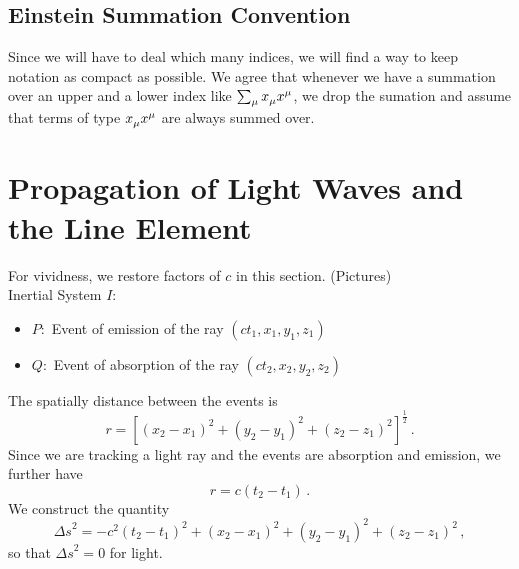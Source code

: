 \subsection{Einstein Summation Convention}
Since we will have to deal which many indices, we will find a way to keep
notation as compact as possible. We agree that whenever we have a summation over an
upper and a lower index like $\sum_\mu \tensor{x}{_\mu}\tensor{x}{^\mu}$, we
drop the sumation and assume that terms of type
$\tensor{x}{_\mu}\tensor{x}{^\mu}$ are always summed over.
\section{Propagation of Light Waves and the Line Element}
For vividness, we restore factors of $c$ in this section.
(Pictures)\\
Inertial System $I$:
\begin{itemize}
    \item $P:$ Event of emission of the ray $(ct_1,x_1,y_1,z_1)$
    \item $Q:$ Event of absorption of the ray $(ct_2,x_2,y_2,z_2)$
\end{itemize}
The spatially distance between the events is
\begin{equation}
    r=\left[(x_2-x_1)^2+(y_2-y_1)^2+(z_2-z_1)^2\right]^{\frac{1}{2}}\, .
\end{equation}
Since we are tracking a light ray and the events are absorption and emission, we
further have
\begin{equation}
    r=c(t_2-t_1)\, .
\end{equation}
We construct the quantity
\begin{equation}
    {\Delta s}^2=-c^2(t_2-t_1)^2+(x_2-x_1)^2+(y_2-y_1)^2+(z_2-z_1)^2\, ,
\end{equation}
so that ${\Delta s}^2=0$ for light.

